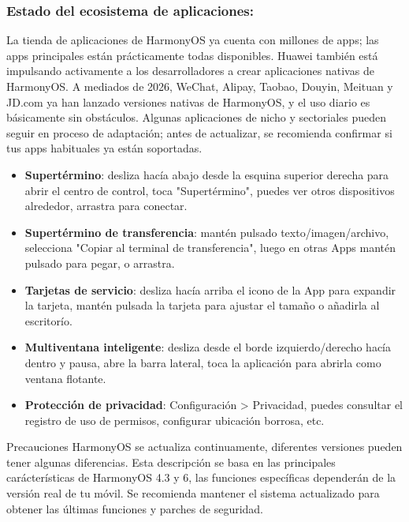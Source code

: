 \subsubsection*{Estado del ecosistema de aplicaciones:}

La tienda de aplicaciones de HarmonyOS ya cuenta con millones de apps; las apps principales están prácticamente todas disponibles. Huawei también está impulsando activamente a los desarrolladores a crear aplicaciones nativas de HarmonyOS. A mediados de 2026, WeChat, Alipay, Taobao, Douyin, Meituan y JD.com ya han lanzado versiones nativas de HarmonyOS, y el uso diario es básicamente sin obstáculos. Algunas aplicaciones de nicho y sectoriales pueden seguir en proceso de adaptación; antes de actualizar, se recomienda confirmar si tus apps habituales ya están soportadas.


\begin{itemize}
  \item \textbf{Supertérmino}: desliza hacía abajo desde la esquina superior derecha para abrir el centro de control, toca "Supertérmino", puedes ver otros dispositivos alrededor, arrastra para conectar.
  \item \textbf{Supertérmino de transferencia}: mantén pulsado texto/imagen/archivo, selecciona "Copiar al terminal de transferencia", luego en otras Apps mantén pulsado para pegar, o arrastra.
  \item \textbf{Tarjetas de servicio}: desliza hacía arriba el icono de la App para expandir la tarjeta, mantén pulsada la tarjeta para ajustar el tamaño o añadirla al escritorío.
  \item \textbf{Multiventana inteligente}: desliza desde el borde izquierdo/derecho hacía dentro y pausa, abre la barra lateral, toca la aplicación para abrirla como ventana flotante.
  \item \textbf{Protección de privacidad}: Configuración > Privacidad, puedes consultar el registro de uso de permisos, configurar ubicación borrosa, etc.
\end{itemize}

\begin{tcbwarn}{Precauciones}
HarmonyOS se actualiza continuamente, diferentes versiones pueden tener algunas diferencias. Esta descripción se basa en las principales carácterísticas de HarmonyOS 4.3 y 6, las funciones específicas dependerán de la versión real de tu móvil. Se recomienda mantener el sistema actualizado para obtener las últimas funciones y parches de seguridad.

\end{tcbwarn}


